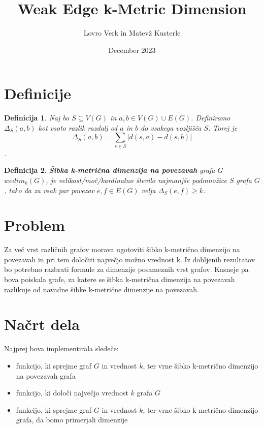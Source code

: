 \documentclass[a4paper,12pt]{article}
\newtheorem{definition}{Definicija}
\begin{document}
\author{Lovro Verk in Matevž Kusterle}
\date{December 2023}
\title{Weak Edge k-Metric Dimension}
\maketitle

\section{Definicije}

    \begin{definition}
       Naj bo $S \subseteq V(G)$ in $a, b \in V(G) \cup E(G)$. Definiramo $\Delta_S (a,b)$ kot vsoto razlik razdalj od $a$ in $b$ do vsakega vozljišča $S$. Torej je $$\Delta_S (a,b) = \sum_{s \in S } |d(s,a) - d(s,b)|$$.
    \end{definition}

    \begin{definition}
        \textbf{Šibka k-metrična dimenzija na povezavah} grafa $G$ $wedim_k(G)$, je velikost/moč/kardinalno število
        najmanjše podmnožice $S$ grafa $G$, tako da za vsak par povezav $e,f \in E(G)$ velja $\Delta_S (e,f) \geq k$.
    \end{definition}

   
\pagebreak

\section{Problem} 
Za več vrst različnih grafov morava ugotoviti šibko k-metrično dimenzijo na povezavah in pri tem določiti največjo možno vrednost k. Iz dobljenih rezultatov bo potrebno razbrati formule za dimenzije posameznih vrst grafov. Kasneje pa bova poiskala grafe, za katere se šibka k-metrična dimenzija na povezavah razlikuje od navadne šibke k-metrične dimenzije na povezavah.
    
\section{Načrt dela}
Najprej bova implementirala sledeče:
    \begin{itemize}
        \item funkcijo, ki sprejme graf $G$ in vrednost $k$, ter vrne šibko k-metrično dimenzijo na povezavah grafa
        \item funkcijo, ki določi največjo vrednost $k$ grafa $G$
        \item funkcijo, ki sprejme graf $G$ in vrednost $k$, ter vrne šibko k-metrično dimenzijo grafa, da bomo primerjali dimenzije
    \end{itemize}
\end{document}
